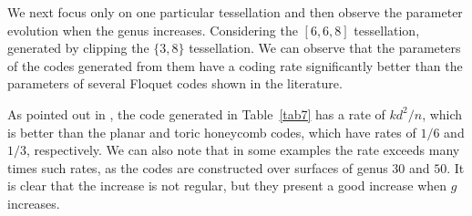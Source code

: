 \documentclass[%
reprint,
amsmath,amssymb,
aps,
]{revtex4-2}
\begin{document}
We next focus only on one particular tessellation and then observe the parameter 
evolution when the genus increases. Considering the $[6, 6, 8]$ tessellation, 
generated by clipping the $\{3, 8\}$ tessellation. We can observe that the parameters of the codes generated from them have a coding rate significantly better than the parameters of several Floquet codes shown in the literature.

As pointed out in \cite{Breuckmann2024}, the code generated in Table~\ref{tab7} has 
a rate of $kd^2/n$, which is better than the planar and toric honeycomb codes, which have rates of $1/6$ and $1/3$, respectively. We can also note that in some examples the rate exceeds many times such rates, as the codes are constructed over surfaces of genus $30$ and $50$. It is clear that the increase is not regular, but they present a good increase when $g$ increases.
\end{document}
